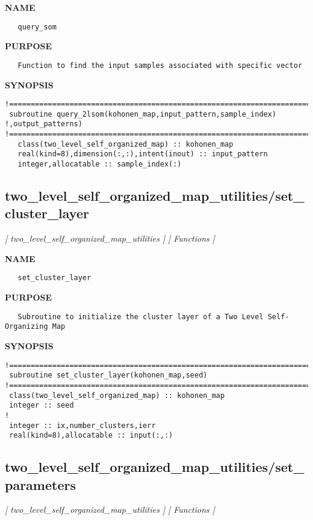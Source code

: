 \documentclass{article}
\begin{document}
\label{ch:robo74}
\label{ch:two_level_self_organized_map_utilities_query_som}
\textbf{NAME}
\begin{verbatim}
   query_som
\end{verbatim}
\textbf{PURPOSE}
\begin{verbatim}
   Function to find the input samples associated with specific vector 
\end{verbatim}
\textbf{SYNOPSIS}
\begin{verbatim}
!========================================================================================
 subroutine query_2lsom(kohonen_map,input_pattern,sample_index) !,output_patterns)
!========================================================================================
   class(two_level_self_organized_map) :: kohonen_map
   real(kind=8),dimension(:,:),intent(inout) :: input_pattern
   integer,allocatable :: sample_index(:)
\end{verbatim}
\newpage
\subsection{two\_level\_self\_organized\_map\_utilities/set\_cluster\_layer}
\textsl{[ two\_level\_self\_organized\_map\_utilities ]}
\textsl{[ Functions ]}

\label{ch:robo75}
\label{ch:two_level_self_organized_map_utilities_set_cluster_layer}
\textbf{NAME}
\begin{verbatim}
   set_cluster_layer
\end{verbatim}
\textbf{PURPOSE}
\begin{verbatim}
   Subroutine to initialize the cluster layer of a Two Level Self-Organizing Map
\end{verbatim}
\textbf{SYNOPSIS}
\begin{verbatim}
!========================================================================================  
 subroutine set_cluster_layer(kohonen_map,seed)
!========================================================================================  
 class(two_level_self_organized_map) :: kohonen_map
 integer :: seed
!
 integer :: ix,number_clusters,ierr
 real(kind=8),allocatable :: input(:,:)
\end{verbatim}
\newpage
\subsection{two\_level\_self\_organized\_map\_utilities/set\_parameters}
\textsl{[ two\_level\_self\_organized\_map\_utilities ]}
\textsl{[ Functions ]}
\end{document}
